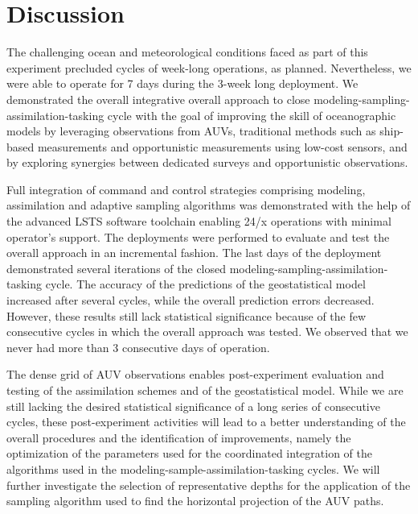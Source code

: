 \section{Discussion}
\label{sec:disc}

The challenging ocean and meteorological conditions faced as part of
this experiment precluded cycles of week-long operations, as
planned. Nevertheless, we were able to operate for 7 days during the
3-week long deployment. We demonstrated the overall integrative
overall approach to close modeling-sampling-assimilation-tasking cycle
with the goal of improving the skill of oceanographic models by
leveraging observations from AUVs, traditional methods such as
ship-based measurements and opportunistic measurements using low-cost
sensors, and by exploring synergies between dedicated surveys and
opportunistic observations.

Full integration of command and control strategies comprising modeling,
assimilation and adaptive sampling algorithms was demonstrated with the
help of the advanced LSTS software toolchain enabling 24/x operations
with minimal operator’s support. The deployments were performed to
evaluate and test the overall approach in an incremental fashion. The
last days of the deployment demonstrated several iterations of the
closed modeling-sampling-assimilation-tasking cycle. The accuracy of the
predictions of the geostatistical model increased after several cycles,
while the overall prediction errors decreased. However, these results
still lack statistical significance because of the few consecutive
cycles in which the overall approach was tested. We observed that we
never had more than 3 consecutive days of operation.

The dense grid of AUV observations enables post-experiment evaluation
and testing of the assimilation schemes and of the geostatistical model.
While we are still lacking the desired statistical significance of a
long series of consecutive cycles, these post-experiment activities will
lead to a better understanding of the overall procedures and the
identification of improvements, namely the optimization of the
parameters used for the coordinated integration of the algorithms used
in the modeling-sample-assimilation-tasking cycles. We will further
investigate the selection of representative depths for the application
of the sampling algorithm used to find the horizontal projection of the
AUV paths.

